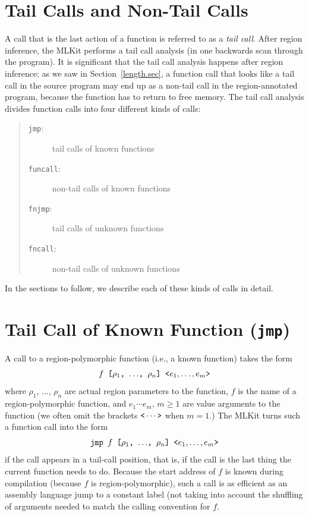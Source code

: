 \documentclass[12pt]{book}
\begin{document}
\section{Tail Calls and Non-Tail Calls}
\label{tailcall.sec}
A call that is the last action of a function is referred to as a {\em
  tail call}. After region inference, the MLKit performs a tail call
analysis (in one backwards scan through the program). It is
significant that the tail call analysis happens after region
inference; as we saw in Section~\ref{length.sec}, a function call that
looks like a tail call in the source program may end up as a non-tail
call in the region-annotated program, because the function has to
return to free memory. The tail call analysis divides function calls
into four different kinds of calls:
\begin{quote}
\begin{description}
\item[{\tt jmp}:] tail calls of known functions
\item[{\tt funcall}:] non-tail calls of known functions
\item[{\tt fnjmp}:] tail calls of unknown functions
\item[{\tt fncall}:] non-tail calls of unknown functions
\end{description}
\end{quote}
In the sections to follow, we describe each of these kinds of calls in
detail.

\section{Tail Call of Known Function (\texttt{jmp})}
\label{simplejump.sec}
A call to a
%
region-polymorphic function (i.e., a known function) takes the form
$$\hbox{\tt $f$ [$\rho_1$, $\ldots$, $\rho_n$] <$e_1,\ldots,e_m$>}$$
where $\rho_1$, $\ldots$, $\rho_n$ are actual region parameters to the
function, $f$ is the name of a region-polymorphic function, and
$e_1 \cdots e_m$, $m \geq 1$ are value arguments to the function (we
often omit the brackets $\verb+<+ \cdots \verb+>+$ when $m = 1$.) The MLKit
turns such a function call into the form
$$\hbox{\tt jmp $f$ [$\rho_1$, $\ldots$, $\rho_n$] <$e_1,\ldots,e_m$>}$$
if the call
appears in a tail-call position, that is, if the call is the last
thing the current function needs to do.  Because the start address of
$f$ is known during compilation (because $f$ is region-polymorphic),
such a call is as efficient as an assembly language jump to a constant
label (not taking into account the shuffling of arguments needed to
match the calling convention for $f$.
\end{document}
